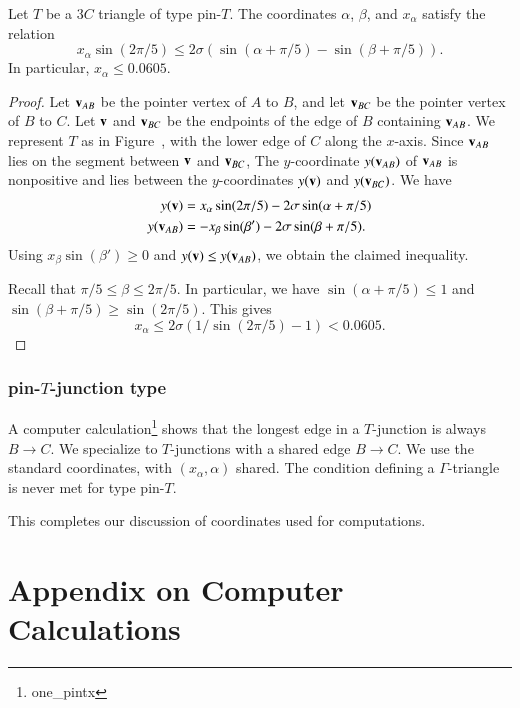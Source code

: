 \begin{lemma}
  Let $T$ be a $3C$ triangle of type pin-$T$.  The coordinates
  $\alpha$, $\beta$, and $x_\alpha$ satisfy the relation
\[
x_\alpha \sin(2\pi/5) \le 2\sigma (\sin(\alpha+\pi/5) - \sin(\beta+\pi/5)).
\]
In particular, $x_\alpha \le 0.0605$.
\end{lemma}

\begin{proof} Let ${\mathbf v}_{AB}$ be the pointer vertex of $A$ to $B$, and
  let ${\mathbf v}_{BC}$ be the pointer vertex of $B$ to $C$.  Let ${\mathbf v}$ and
  ${\mathbf v}_{BC}$ be the endpoints of the edge of $B$ containing ${\mathbf v}_{AB}$.
  We represent $T$ as in Figure~, with the lower edge of
  $C$ along the $x$-axis.  Since ${\mathbf v}_{AB}$ lies on the segment between
  ${\mathbf v}$ and ${\mathbf v}_{BC}$, The $y$-coordinate $y({\mathbf v}_{AB})$ of ${\mathbf v}_{AB}$ is
  nonpositive and lies between the $y$-coordinates $y({\mathbf v})$ and
  $y({\mathbf v}_{BC})$.  We have
\begin{align*}
y({\mathbf v}) &= x_\alpha \sin(2\pi/5) - 2\sigma\sin(\alpha+\pi/5)\\
y({\mathbf v}_{AB}) & = -x_\beta \sin(\beta') - 2\sigma\sin(\beta+\pi/5).
\end{align*}
Using $x_\beta \sin(\beta')\ge 0$ and $y({\mathbf v}) \le y({\mathbf v}_{AB})$, we
obtain the claimed inequality.

Recall that $\pi/5\le \beta \le 2\pi/5$.  In particular, we have
$\sin(\alpha+\pi/5) \le 1$ and $\sin(\beta+\pi/5)\ge \sin(2\pi/5)$.
This gives
\[
x_\alpha \le 2\sigma(1/\sin(2\pi/5) - 1) < 0.0605.
\]
\end{proof}

\subsubsection{pin-$T$-junction type}

A computer calculation\footnote{one\_pintx} shows that the longest edge in a $T$-junction is always $B\to C$.
We specialize to $T$-junctions with a shared edge $B\to C$.   We use the standard coordinates,
with $(x_\alpha,\alpha)$ shared.
The condition defining a $\Gamma$-triangle is never met for type pin-$T$.


This completes our discussion of coordinates used for computations.

\section{Appendix on Computer Calculations}


